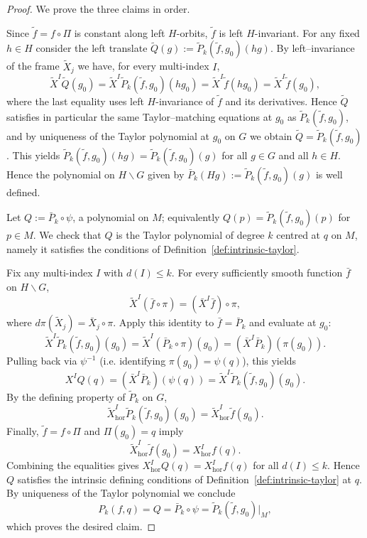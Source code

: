 \documentclass[12pt]{amsart}
\begin{document}
\begin{proof}
We prove the three claims in order.

\medskip{}
Since \(\tilde f = f\circ\Pi\) is constant along left \(H\)-orbits, \(\tilde f\) is left \(H\)-invariant.
For any fixed \(h\in H\) consider the left translate \(\tilde Q(g):=\tilde P_k(\tilde f,g_0)(hg)\).
By left--invariance of the frame \(\tilde X_j\) we have, for every multi-index \(I\),
\[
\tilde X^I \tilde Q(g_0) = \tilde X^I \tilde P_k(\tilde f,g_0)(hg_0)
= \tilde X^I \tilde f(hg_0) = \tilde X^I \tilde f(g_0),
\]
where the last equality uses left \(H\)-invariance of \(\tilde f\) and its derivatives.
Hence \(\tilde Q\) satisfies in particular the same Taylor--matching equations at \(g_0\) as \(\tilde P_k(\tilde f,g_0)\), and by uniqueness of the Taylor polynomial at \(g_0\) on $G$ we obtain \(\tilde Q=\tilde P_k(\tilde f,g_0)\).  This yields \(\tilde P_k(\tilde f,g_0)(hg)=\tilde P_k(\tilde f,g_0)(g)\) for all \(g\in G\) and all \(h\in H\). Hence the polynomial on $H\backslash G$ given by \(\bar P_k(Hg):=\tilde P_k(\tilde f,g_0)(g)\) is well defined.


\medskip{}
Let \(Q := \bar P_k\circ\psi\), a polynomial on \(M\); equivalently \(Q(p)=\tilde P_k(\tilde f,g_0)(p)\) for \(p\in M\).
We check that \(Q\) is the Taylor polynomial of degree $k$ centred at \(q\) on $M$, namely it satisfies the conditions of Definition~\ref{def:intrinsic-taylor}.

Fix any multi-index \(I\) with \(d(I)\le k\).  For every sufficiently smooth function \(\bar f\) on \(H\backslash G\),
\[
\tilde X^I(\bar f\circ\pi) = ( \bar X^I\bar f)\circ\pi,
\]
where 
\(d\pi(\tilde X_j)=\bar X_j\circ\pi\).
Apply this identity to \(\bar f=\bar P_k\) and evaluate at \(g_0\):
\[
\tilde X^I \tilde P_k(\tilde f,g_0)(g_0)
= \tilde X^I(\bar P_k\circ\pi)(g_0)
= (\bar X^I\bar P_k)(\pi(g_0)).
\]
Pulling back via \(\psi^{-1}\) (i.e. identifying \(\pi(g_0)=\psi(q)\)), this yields
\[
X^I Q(q) = (\bar X^I\bar P_k)(\psi(q)) = \tilde X^I \tilde P_k(\tilde f,g_0)(g_0).
\]
By the defining property of \(\tilde P_k\) on \(G\),
\[
\tilde X_{\mathrm{hor}}^I \tilde P_k(\tilde f,g_0)(g_0) = \tilde X_{\mathrm{hor}}^I \tilde f(g_0).
\]
Finally, \(\tilde f=f\circ\Pi\) and \(\Pi(g_0)=q\) imply 
\[
\tilde X_{\mathrm{hor}}^I \tilde f(g_0) = X_{\mathrm{hor}}^I f(q).
\]
Combining the equalities gives \(X_{\mathrm{hor}}^I Q(q) = X_{\mathrm{hor}}^I f(q)\) for all \(d(I)\le k\).  Hence \(Q\) satisfies the intrinsic defining conditions of Definition~\ref{def:intrinsic-taylor} at \(q\). By uniqueness of the Taylor polynomial we conclude
\[
P_k(f,q) = Q = \bar P_k\circ\psi = \tilde P_k(\tilde f,g_0)\big|_{M},
\]
which proves the desired claim.


\end{proof}
\end{document}
